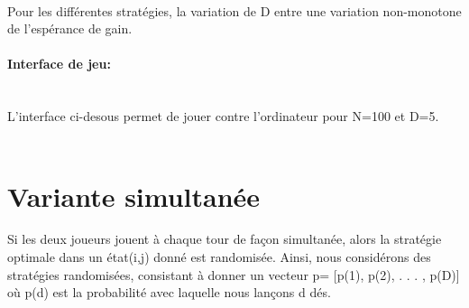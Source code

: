 \documentclass{article}
\begin{document}
\begin{large}
        \qquad
        \\[1.5em]
         Pour les différentes stratégies, la variation de D entre une variation non-monotone de l'espérance de gain.
    
         \paragraph{Interface de jeu: }\\
          L'interface ci-desous permet de jouer contre l'ordinateur pour N=100 et D=5.\\[2em]
    
    
         \centering
          \\
         
      \end{large}
  

\section{Variante simultanée}
    \large{
    Si les deux joueurs jouent à chaque tour de façon simultanée, alors la stratégie optimale dans un état(i,j) donné est randomisée. Ainsi, nous considérons des stratégies randomisées, consistant à donner un vecteur p= [p(1), p(2), . . . , p(D)] où p(d) est la probabilité avec laquelle nous lançons d dés.}
    
\end{document}
